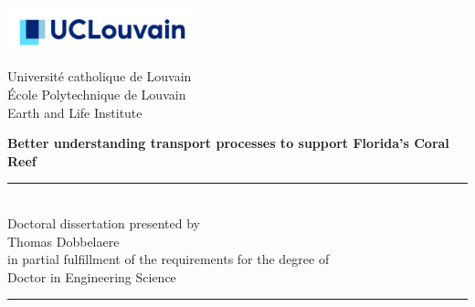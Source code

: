 \thispagestyle{empty}
\begin{minipage}[b]{0.3\textwidth}
\hspace*{-0.8cm}\includegraphics[width=5.5cm]{./figures/logo_ucl.jpg}\vspace{0.85cm}
\end{minipage}
\begin{minipage}[b]{0.69\textwidth}

\begin{center}
\hspace*{0.5cm}Université catholique de Louvain\\
\hspace*{0.5cm}\'Ecole Polytechnique de Louvain\\
\hspace*{0.5cm} Earth and Life Institute\\
\end{center}
\end{minipage}


\vspace*{1.2cm}
\hspace{-0.8cm}
\begin{minipage}{1.02\linewidth}
\centering
\LARGE\bfseries Better understanding transport processes to support Florida's Coral Reef %
\end{minipage}


\vspace*{0.5cm}
\hspace{-0.5cm}\begin{minipage}{\textwidth}
\centering
\rule{50pt}{.5pt}\\[1.2ex]
Doctoral dissertation presented by \\ [2.ex]
{\Large Thomas Dobbelaere\\ [2.ex]
}
in partial fulfillment of the requirements for the degree of\\ [2.ex]
\Large Doctor in Engineering Science

\rule{50pt}{.5pt}\\
\end{minipage}

